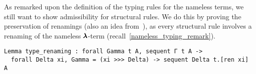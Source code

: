 As remarked upon the definition of the typing rules for the nameless terms, we still want to show admissibility for structural rules.
We do this by proving the preservation of renamings (also an idea from~\cite{AutosubstManual}), as every structural rule involves a renaming of the nameless $\pmb{\lambda}$-term (recall~\cref{nameless_typing_remark}).

\begin{lstlisting}[language=Coq]
Lemma type_renaming : forall Gamma t A, sequent Γ t A ->
  forall Delta xi, Gamma = (xi >>> Delta) -> sequent Delta t.[ren xi] A
\end{lstlisting}
  
